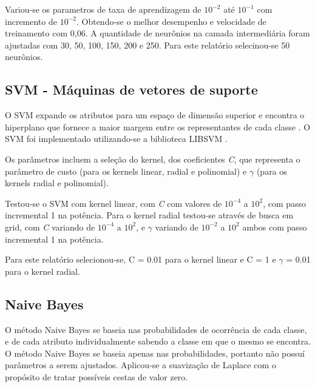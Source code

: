 Variou-se os parametros de taxa de aprendizagem de \(10^{-2}\) até \(10^{-1}\) com incremento de \(10^{-2}\). Obtendo-se o melhor desempenho e velocidade de treinamento com 0,06. A quantidade de neurônios na camada intermediária foram ajustadas com 30, 50, 100, 150, 200 e 250. Para este relatório selecinou-se 50 neurônios.

\subsection{SVM - Máquinas de vetores de suporte}

O SVM expande os atributos para um espaço de dimensão superior e encontra o hiperplano que fornece a maior margem entre os representantes de cada classe \cite{praticalSVM}. O SVM foi implementado utilizando-se a biblioteca LIBSVM \cite{libsvm}.

Os parâmetros incluem a seleção do kernel, dos coeficientes \emph{C}, que representa o parâmetro de custo (para os kernels linear, radial e polinomial) e \(\gamma\) (para os kernels radial e polinomial).

Testou-se o SVM com kernel linear, com \emph{C} com valores de \(10^{-4}\) a \(10^2\), com passo incremental 1 na potência. Para o kernel radial testou-se através de busca em grid, com \emph{C} variando de \(10^{-4}\) a \(10^2\), e \(\gamma\) variando de \(10^{-2}\) a \(10^2\) ambos com passo incremental 1 na potência.

Para este relatório selecionou-se, C = 0.01 para o kernel linear e C = 1 e \(\gamma\) = 0.01 para o kernel radial.

\subsection{Naive Bayes}

O método Naive Bayes se baseia nas probabilidades de ocorrência de cada classe, e de cada atributo individualmente sabendo a classe em que o mesmo se encontra. O método Naive Bayes se baseia apenas nas probabilidades, portanto não possuí parâmetros a serem ajustados. Aplicou-se a suavização de Laplace com o propósito de tratar possíveis cestas de valor zero.

